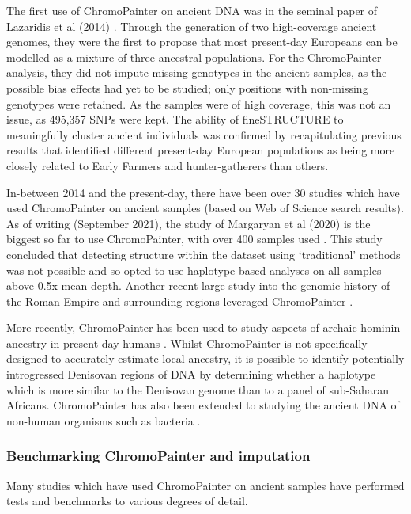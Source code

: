 The first use of ChromoPainter on ancient DNA was in the seminal paper of Lazaridis et al (2014) \cite{Lazaridis2014}. Through the generation of two high-coverage ancient genomes, they were the first to propose that most present-day Europeans can be modelled as a mixture of three ancestral populations. For the ChromoPainter analysis, they did not impute missing genotypes in the ancient samples, as the possible bias effects had yet to be studied; only positions with non-missing genotypes were retained. As the samples were of high coverage, this was not an issue, as 495,357 SNPs were kept. The ability of fineSTRUCTURE to meaningfully cluster ancient individuals was confirmed by recapitulating previous results that identified different present-day European populations as being more closely related to Early Farmers and hunter-gatherers than others. 

In-between 2014 and the present-day, there have been over 30 studies which have used ChromoPainter on ancient samples (based on Web of Science search results). As of writing (September 2021), the study of Margaryan et al (2020) is the biggest so far to use ChromoPainter, with over 400 samples used \cite{margaryan2020population}. This study concluded that detecting structure within the dataset using `traditional' methods was not possible and so opted to use haplotype-based analyses on all samples above 0.5x mean depth. Another recent large study into the genomic history of the Roman Empire and surrounding regions leveraged ChromoPainter \cite{antonio2019ancient}.

More recently, ChromoPainter has been used to study aspects of archaic hominin ancestry in present-day humans \cite{JACOBS20191010, teixeira2021widespread}. Whilst ChromoPainter is not specifically designed to accurately estimate local ancestry, it is possible to identify potentially introgressed Denisovan regions of DNA by determining whether a haplotype which is more similar to the Denisovan genome than to a panel of sub-Saharan Africans. ChromoPainter has also been extended to studying the ancient DNA of non-human organisms such as bacteria \cite{Moodleye2015523118}. 

\subsubsection{Benchmarking ChromoPainter and imputation}

Many studies which have used ChromoPainter on ancient samples have performed tests and benchmarks to various degrees of detail. 

